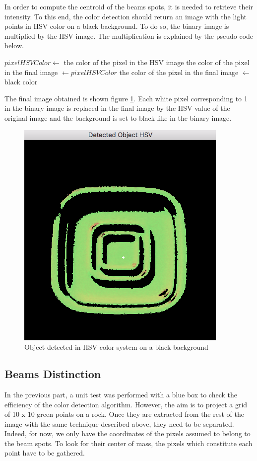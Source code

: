 In order to compute the centroid of the beams spots, it is needed to retrieve their intensity. To this end, the color detection should return an image with the light points in HSV color on a black background. To do so, the binary image is multiplied by the HSV image. The multiplication is explained by the pseudo code below. 

\begin{algorithmic}
    			\State $pixelHSVColor \gets$ the color of the pixel in the HSV image
    			\State the color of the pixel in the final image $\gets pixelHSVColor$
		\Else
        			\State the color of the pixel in the final image $\gets$ black color
		\EndIf
	\EndFor
\EndFunction
\end{algorithmic}

The final image obtained is shown figure \ref{fig:finalImage}. Each white pixel corresponding to 1 in the binary image is replaced in the final image by the HSV value of the original image and the background is set to black like in the binary image.

\begin{figure}[h]
  \centering
  \includegraphics[scale=0.6]{fig/finalImage.png}
  \caption{Object detected in HSV color system on a black background}
  \label{fig:finalImage}
\end{figure}

\subsection{Beams Distinction}
In the previous part, a unit test was performed with a blue box to check the efficiency of the color detection algorithm. However, the aim is to project a grid of 10 x 10 green points on a rock. Once they are extracted from the rest of the image with the same technique described above, they need to be separated. Indeed, for now, we only have the coordinates of the pixels assumed to belong to the beam spots. To look for their center of mass, the pixels which constitute each point have to be gathered. 

